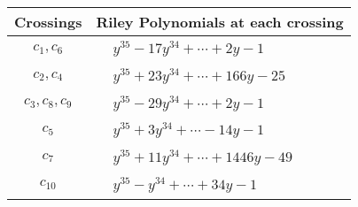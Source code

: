 \documentclass[1p]{elsarticle_modified}
\theoremstyle{definition}
\begin{document}
\begin{tabular}{m{50pt}|m{274pt}}
Crossings & \hspace{64pt}Riley Polynomials at each crossing \\
\hline $$\begin{aligned}c_{1},c_{6}\end{aligned}$$&$\begin{aligned}
&y^{35}-17 y^{34}+\cdots+2 y-1
\end{aligned}$\\
\hline $$\begin{aligned}c_{2},c_{4}\end{aligned}$$&$\begin{aligned}
&y^{35}+23 y^{34}+\cdots+166 y-25
\end{aligned}$\\
\hline $$\begin{aligned}c_{3},c_{8},c_{9}\end{aligned}$$&$\begin{aligned}
&y^{35}-29 y^{34}+\cdots+2 y-1
\end{aligned}$\\
\hline $$\begin{aligned}c_{5}\end{aligned}$$&$\begin{aligned}
&y^{35}+3 y^{34}+\cdots-14 y-1
\end{aligned}$\\
\hline $$\begin{aligned}c_{7}\end{aligned}$$&$\begin{aligned}
&y^{35}+11 y^{34}+\cdots+1446 y-49
\end{aligned}$\\
\hline $$\begin{aligned}c_{10}\end{aligned}$$&$\begin{aligned}
&y^{35}- y^{34}+\cdots+34 y-1
\end{aligned}$\\
\hline
\end{tabular}
\vskip 2pc
\end{document}
